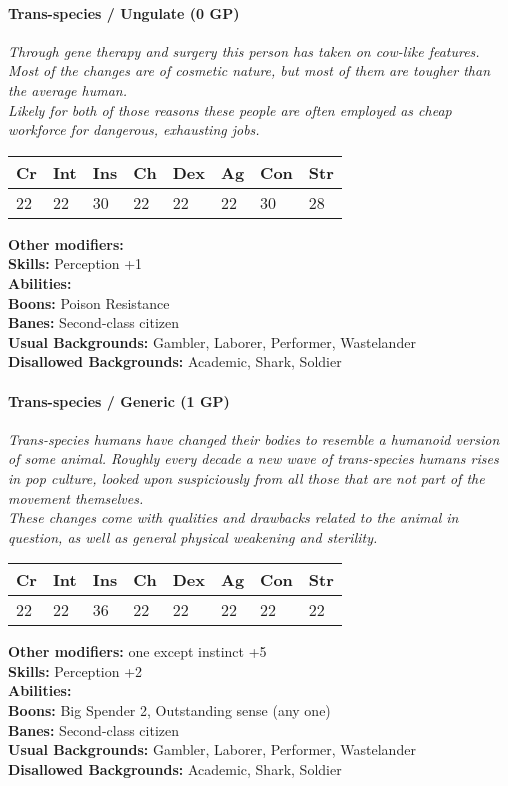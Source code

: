 \documentclass[12pt,a4paper,openany]{book}
\begin{document}
	\hrulefill
	\paragraph*{Trans-species / Ungulate (0 GP)}
	\textit{Through gene therapy and surgery this person has taken on cow-like features. Most of the changes are of cosmetic nature, but most of them are tougher than the average human.\\
	Likely for both of those reasons these people are often employed as cheap workforce for dangerous, exhausting jobs.}\par
	\begin{tabular}{|l|l|l|l|l|l|l|l|}
		\hline
		Cr & Int & Ins & Ch & Dex & Ag & Con & Str \\ \hline
		22 & 22 & 30 & 22 & 22 & 22 & 30 & 28 \\ \hline
	\end{tabular}\par
	\noindent\textbf{Other modifiers:} \\
	\textbf{Skills:} Perception +1\\
	\textbf{Abilities:} \\
	\textbf{Boons:} Poison Resistance\\
	\textbf{Banes:} Second-class citizen\\
	\textbf{Usual Backgrounds:} Gambler, Laborer, Performer, Wastelander\\
	\textbf{Disallowed Backgrounds:} Academic, Shark, Soldier
	
	\hrulefill
	\paragraph*{Trans-species / Generic (1 GP)}
	\textit{Trans-species humans have changed their bodies to resemble a humanoid version of some animal. Roughly every decade a new wave of trans-species humans rises in pop culture, looked upon suspiciously from all those that are not part of the movement themselves.\\
	These changes come with qualities and drawbacks related to the animal in question, as well as general physical weakening and sterility.}\par
	\begin{tabular}{|l|l|l|l|l|l|l|l|}
		\hline
		Cr & Int & Ins & Ch & Dex & Ag & Con & Str \\ \hline
		22 & 22 & 36 & 22 & 22 & 22 & 22 & 22 \\ \hline
	\end{tabular}\par
	\noindent\textbf{Other modifiers:} one except instinct +5\\
	\textbf{Skills:} Perception +2\\
	\textbf{Abilities:} \\
	\textbf{Boons:} Big Spender 2, Outstanding sense (any one)\\
	\textbf{Banes:} Second-class citizen\\
	\textbf{Usual Backgrounds:} Gambler, Laborer, Performer, Wastelander\\
	\textbf{Disallowed Backgrounds:} Academic, Shark, Soldier
	
\end{document}
